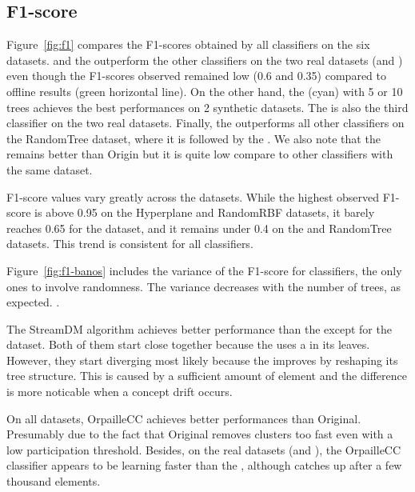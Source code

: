 \subsection{F1-score}
Figure~\ref{fig:f1} compares the F1-scores obtained by all classifiers on the
six datasets.  \naivebayes and the \hoeffdingtree outperform the other
classifiers on the two real datasets (\banosdataset and \recofitdataset) even
though the F1-scores observed remained low (0.6 and 0.35) compared to offline
results (green horizontal line). On the other hand, the \mondrianforest (cyan)
with 5 or 10 trees achieves the best performances on 2 synthetic datasets.  The
\mondrianforest is also the third classifier on the two real datasets.
Finally, the \hoeffdingtree outperforms all other classifiers on the RandomTree
dataset, where it is followed by the \mondrianforest. We also note that the
\FNN remains better than \mcnn Origin but it is quite low compare to other
classifiers with the same dataset.

F1-score values vary greatly across the datasets.  While the highest
observed F1-score is above 0.95 on the Hyperplane and RandomRBF datasets,
it barely reaches 0.65 for the \banosdataset dataset, and it remains under
0.4 on the \recofitdataset and RandomTree datasets. This trend is
consistent for all classifiers.

Figure~\ref{fig:f1-banos} includes the variance of the F1-score for
\mondrianforest classifiers, the only ones to involve randomness. The
variance decreases with the number of trees, as expected.
.

The StreamDM \hoeffdingtree algorithm achieves better performance than the
\naivebayes except for the \banosdataset dataset.  Both of them start close
together because the \hoeffdingtree uses a \naivebayes in its leaves.  However,
they start diverging most likely because the \hoeffdingtree improves by reshaping its tree
structure.  This is caused by a sufficient amount of element and the difference
is more noticable when a concept drift occurs.

On all datasets, \mcnn OrpailleCC achieves better performances than \mcnn
Original. Presumably due
to the fact that \mcnn Original removes clusters too fast even with a low
participation threshold.
Besides, on the real datasets (\banosdataset and \recofitdataset), the \mcnn OrpailleCC
classifier appears to be learning faster than the \mondrianforest, although
\mondrianforest catches up after a few thousand elements. 

